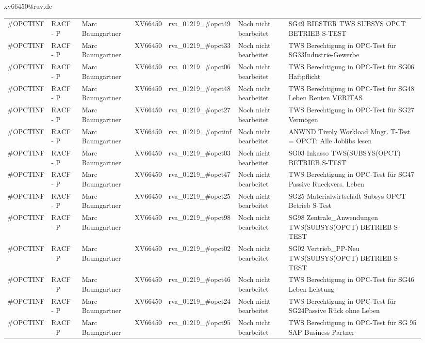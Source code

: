 \documentclass[a4paper,landscape,12pt]{letter}
\begin{document}
\begin{letter}{xv66450@ruv.de\hfill \break}
\begin{tiny}
\begin{longtable}{|p{35mm}|p{15mm}|p{25mm}|p{10mm}|p{40mm}|p{50mm}|p{50mm}|}
\#OPCTINF & RACF - P & Marc Baumgartner & XV66450 & rva\_01219\_\#opct49 & Noch nicht bearbeitet & SG49 RIESTER TWS SUBSYS OPCT BETRIEB S-TEST \\
\#OPCTINF & RACF - P & Marc Baumgartner & XV66450 & rva\_01219\_\#opct33 & Noch nicht bearbeitet & TWS Berechtigung in OPC-Test für SG33Industrie-Gewerbe \\
\#OPCTINF & RACF - P & Marc Baumgartner & XV66450 & rva\_01219\_\#opct06 & Noch nicht bearbeitet & TWS Berechtigung in OPC-Test für SG06 Haftpflicht \\
\#OPCTINF & RACF - P & Marc Baumgartner & XV66450 & rva\_01219\_\#opct48 & Noch nicht bearbeitet & TWS Berechtigung in OPC-Test für SG48 Leben Renten VERITAS \\
\#OPCTINF & RACF - P & Marc Baumgartner & XV66450 & rva\_01219\_\#opct27 & Noch nicht bearbeitet & TWS Berechtigung in OPC-Test für SG27 Vermögen \\
\#OPCTINF & RACF - P & Marc Baumgartner & XV66450 & rva\_01219\_\#opctinf & Noch nicht bearbeitet & ANWND Tivoly Workload Mngr. T-Test = OPCT: Alle Joblibs lesen \\
\#OPCTINF & RACF - P & Marc Baumgartner & XV66450 & rva\_01219\_\#opct03 & Noch nicht bearbeitet & SG03 Inkasso TWS(SUBSYS(OPCT) BETRIEB S-TEST \\
\#OPCTINF & RACF - P & Marc Baumgartner & XV66450 & rva\_01219\_\#opct47 & Noch nicht bearbeitet & TWS Berechtigung in OPC-Test für SG47 Passive Rueckvers. Leben \\
\#OPCTINF & RACF - P & Marc Baumgartner & XV66450 & rva\_01219\_\#opct25 & Noch nicht bearbeitet & SG25 Materialwirtschaft Subsys OPCT Betrieb S-Test \\
\#OPCTINF & RACF - P & Marc Baumgartner & XV66450 & rva\_01219\_\#opct98 & Noch nicht bearbeitet & SG98 Zentrale\_Anwendungen TWS(SUBSYS(OPCT) BETRIEB S-TEST \\
\#OPCTINF & RACF - P & Marc Baumgartner & XV66450 & rva\_01219\_\#opct02 & Noch nicht bearbeitet & SG02 Vertrieb\_PP-Neu TWS(SUBSYS(OPCT) BETRIEB S-TEST \\
\#OPCTINF & RACF - P & Marc Baumgartner & XV66450 & rva\_01219\_\#opct46 & Noch nicht bearbeitet & TWS Berechtigung in OPC-Test für SG46 Leben Leistung \\
\#OPCTINF & RACF - P & Marc Baumgartner & XV66450 & rva\_01219\_\#opct24 & Noch nicht bearbeitet & TWS Berechtigung in OPC-Test für SG24Passive Rück ohne Leben \\
\#OPCTINF & RACF - P & Marc Baumgartner & XV66450 & rva\_01219\_\#opct95 & Noch nicht bearbeitet &  TWS Berechtigung in OPC-Test für SG 95 SAP Business Partner \\

\end{longtable}
\end{tiny}
\end{letter}
\end{document}
